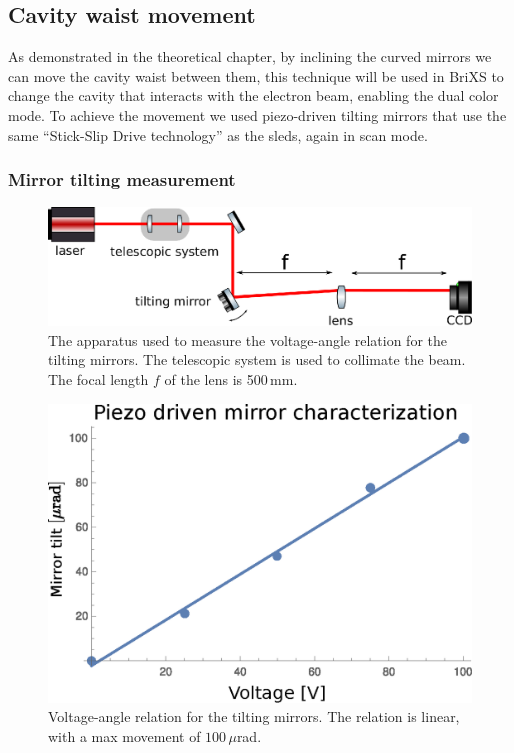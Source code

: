 \subsection{Cavity waist movement}

As demonstrated in the theoretical chapter, by inclining the curved mirrors we can move the cavity waist between them, this technique will be used in BriXS to change the cavity that interacts with the electron beam, enabling the dual color mode. To achieve the movement we used piezo-driven tilting mirrors that use the same ``Stick-Slip Drive technology'' as the sleds, again in scan mode.

\subsubsection{Mirror tilting measurement}
\begin{figure}
	\centering
	\includegraphics[width=0.9\linewidth]{images/tiltingme.eps}
	\caption{The apparatus used to measure the voltage-angle relation for the tilting mirrors. The telescopic system is used to collimate the beam. The focal length $f$ of the lens is 500\,mm.}
	\label{fig:tiltingme}
\end{figure}
\begin{figure}
	\centering
	\includegraphics[width=0.8\linewidth]{images/mirrortilt.eps}
	\caption{Voltage-angle relation for the tilting mirrors. The relation is linear, with a max movement of $100\,\mu$rad.}
	\label{fig:mirrortilt}
\end{figure}

